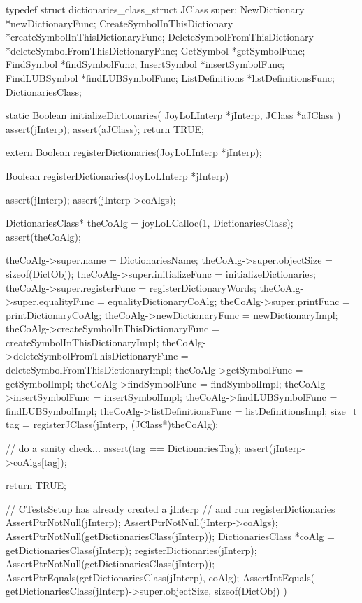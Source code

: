 \startTestSuite[registerDictionaries]

\startCHeader
typedef struct dictionaries_class_struct {
  JClass           super;
  NewDictionary   *newDictionaryFunc;
  CreateSymbolInThisDictionary
                  *createSymbolInThisDictionaryFunc;
  DeleteSymbolFromThisDictionary
                  *deleteSymbolFromThisDictionaryFunc;
  GetSymbol       *getSymbolFunc;
  FindSymbol      *findSymbolFunc;
  InsertSymbol    *insertSymbolFunc;
  FindLUBSymbol   *findLUBSymbolFunc;
  ListDefinitions *listDefinitionsFunc;  
} DictionariesClass;

\stopCHeader

\startCCode
static Boolean initializeDictionaries(
  JoyLoLInterp *jInterp,
  JClass       *aJClass
) {
  assert(jInterp);
  assert(aJClass);
  return TRUE;
}
\stopCCode

\startCHeader
extern Boolean registerDictionaries(JoyLoLInterp *jInterp);
\stopCHeader
{}

\startCCode
Boolean registerDictionaries(JoyLoLInterp *jInterp) {
  assert(jInterp);
  assert(jInterp->coAlgs);
  
  DictionariesClass* theCoAlg
    = joyLoLCalloc(1, DictionariesClass);
  assert(theCoAlg);
  
  theCoAlg->super.name           = DictionariesName;
  theCoAlg->super.objectSize     = sizeof(DictObj);
  theCoAlg->super.initializeFunc = initializeDictionaries;
  theCoAlg->super.registerFunc   = registerDictionaryWords;
  theCoAlg->super.equalityFunc   = equalityDictionaryCoAlg;
  theCoAlg->super.printFunc      = printDictionaryCoAlg;
  theCoAlg->newDictionaryFunc    = newDictionaryImpl;
  theCoAlg->createSymbolInThisDictionaryFunc =
    createSymbolInThisDictionaryImpl;
  theCoAlg->deleteSymbolFromThisDictionaryFunc =
    deleteSymbolFromThisDictionaryImpl;
  theCoAlg->getSymbolFunc        = getSymbolImpl;
  theCoAlg->findSymbolFunc       = findSymbolImpl;
  theCoAlg->insertSymbolFunc     = insertSymbolImpl;
  theCoAlg->findLUBSymbolFunc    = findLUBSymbolImpl;
  theCoAlg->listDefinitionsFunc  = listDefinitionsImpl;  
  size_t tag =
    registerJClass(jInterp, (JClass*)theCoAlg);
  
  // do a sanity check...
  assert(tag == DictionariesTag);
  assert(jInterp->coAlgs[tag]);
   
  return TRUE;
}
\stopCCode


\startCTest
  // CTestsSetup has already created a jInterp
  // and run registerDictionaries
  AssertPtrNotNull(jInterp);
  AssertPtrNotNull(jInterp->coAlgs);
  AssertPtrNotNull(getDictionariesClass(jInterp));
  DictionariesClass *coAlg = getDictionariesClass(jInterp);
  registerDictionaries(jInterp);
  AssertPtrNotNull(getDictionariesClass(jInterp));
  AssertPtrEquals(getDictionariesClass(jInterp), coAlg);
  AssertIntEquals(
    getDictionariesClass(jInterp)->super.objectSize,
    sizeof(DictObj)
  )
\stopCTest
\stopTestCase
\stopTestSuite

